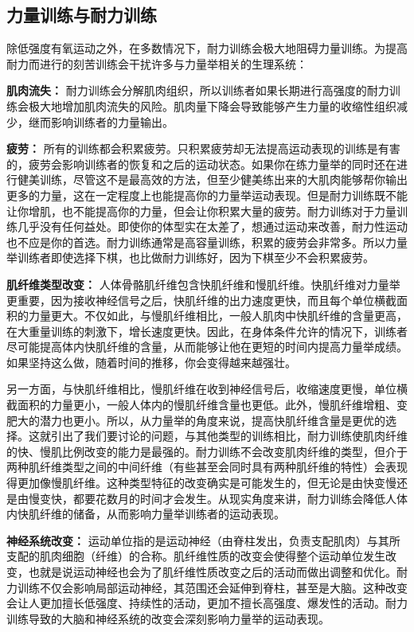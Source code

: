 \documentclass[fontset=fandol, a4paper, 12pt, openright]{ctexbook}
\begin{document}
\subsection{力量训练与耐力训练}

除低强度有氧运动之外，在多数情况下，耐力训练会极大地阻碍力量训练。为提高耐力而进行的刻苦训练会干扰许多与力量举相关的生理系统：

\textbf{肌肉流失：} 耐力训练会分解肌肉组织，所以训练者如果长期进行高强度的耐力训练会极大地增加肌肉流失的风险。肌肉量下降会导致能够产生力量的收缩性组织减少，继而影响训练者的力量输出。

\textbf{疲劳：} 所有的训练都会积累疲劳。只积累疲劳却无法提高运动表现的训练是有害的，疲劳会影响训练者的恢复和之后的运动状态。如果你在练力量举的同时还在进行健美训练，尽管这不是最高效的方法，但至少健美练出来的大肌肉能够帮你输出更多的力量，这在一定程度上也能提高你的力量举运动表现。但是耐力训练既不能让你增肌，也不能提高你的力量，但会让你积累大量的疲劳。耐力训练对于力量训练几乎没有任何益处。即使你的体型实在太差了，想通过运动来改善，耐力性运动也不应是你的首选。耐力训练通常是高容量训练，积累的疲劳会非常多。所以力量举训练者即使选择下棋，也比做耐力训练好，因为下棋至少不会积累疲劳。

\textbf{肌纤维类型改变：} 人体骨骼肌纤维包含快肌纤维和慢肌纤维。快肌纤维对力量举更重要，因为接收神经信号之后，快肌纤维的出力速度更快，而且每个单位横截面积的力量更大。不仅如此，与慢肌纤维相比，一般人肌肉中快肌纤维的含量更高，在大重量训练的刺激下，增长速度更快。因此，在身体条件允许的情况下，训练者尽可能提高体内快肌纤维的含量，从而能够让他在更短的时间内提高力量举成绩。如果坚持这么做，随着时间的推移，你会变得越来越强壮。

另一方面，与快肌纤维相比，慢肌纤维在收到神经信号后，收缩速度更慢，单位横截面积的力量更小，一般人体内的慢肌纤维含量也更低。此外，慢肌纤维增粗、变肥大的潜力也更小。所以，从力量举的角度来说，提高快肌纤维含量是更优的选择。这就引出了我们要讨论的问题，与其他类型的训练相比，耐力训练使肌肉纤维的快、慢肌比例改变的能力是最强的。耐力训练不会改变肌肉纤维的类型，但介于两种肌纤维类型之间的中间纤维（有些甚至会同时具有两种肌纤维的特性）会表现得更加像慢肌纤维。这种类型特征的改变确实是可能发生的，但无论是由快变慢还是由慢变快，都要花数月的时间才会发生。从现实角度来讲，耐力训练会降低人体内快肌纤维的储备，从而影响力量举训练者的运动表现。

\textbf{神经系统改变：} 运动单位指的是运动神经（由脊柱发出，负责支配肌肉）与其所支配的肌肉细胞（纤维）的合称。肌纤维性质的改变会使得整个运动单位发生改变，也就是说运动神经也会为了肌纤维性质改变之后的活动而做出调整和优化。耐力训练不仅会影响局部运动神经，其范围还会延伸到脊柱，甚至是大脑。这种改变会让人更加擅长低强度、持续性的活动，更加不擅长高强度、爆发性的活动。耐力训练导致的大脑和神经系统的改变会深刻影响力量举的运动表现。
\end{document}
